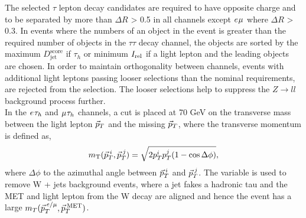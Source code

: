 The selected $\tau$ lepton decay candidates are required to have opposite charge and to be separated by more than $\Delta R$ > 0.5 in all channels except $e_{}\mu_{}$ where $\Delta R$ > 0.3.
In events where the numbers of an object in the event is greater than the required number of objects in the $\tau\tau$ decay channel, the objects are sorted by the maximum $D_{\text{jet}}^{\text{score}}$ if $\tau_h$ or minimum $I_{\text{rel}}$ if a light lepton and the leading objects are chosen.
In order to maintain orthogonality between channels, events with additional light leptons passing looser selections than the nominal requirements, are rejected from the selection.
The looser selections help to suppress the $Z \rightarrow ll$ background process further. \\

In the $e_{}\tau_{h}$ and $\mu_{}\tau_{h}$ channels, a cut is placed at 70 GeV on the transverse mass between the light lepton $\vec{p}_{T}$ and the missing $\vec{p}_{T}$, where the transverse momentum is defined as,
\begin{equation}
m_{\text{T}}(\vec{p}_{T}^{\hspace{2pt}i},\vec{p}_{T}^{\hspace{2pt}j}) = \sqrt{2p_{T}^{i}p_{T}^{j}(1-\cos\Delta\phi)},
\label{eqn:mt}
\end{equation}
where $\Delta\phi$ to the azimuthal angle between $\vec{p}_{T}^{\hspace{2pt}i}$ and $\vec{p}_{T}^{\hspace{2pt}j}$.
The variable is used to remove W + jets background events, where a jet fakes a hadronic tau and the MET and light lepton from the W decay are aligned and hence the event has a large $m_{T}(\vec{p}_{T}^{\hspace{2pt}e/\mu},\vec{p}_{T}^{\hspace{2pt}\text{MET}})$.

